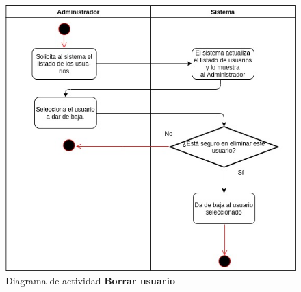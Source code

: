 \pagebreak
\begin{figure}[h]
\centering
\caption{Diagrama de actividad \textbf{Borrar usuario}}\label{fig:priorReq}
\includegraphics[width=1\textwidth, height=1.5\textwidth]{images/diag_act_borrar_usuario}
\end{figure}